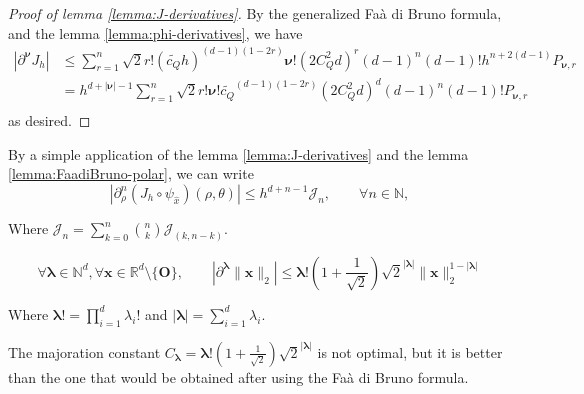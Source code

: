 ﻿\documentclass{article}
\begin{document}
\begin{proof}[Proof of lemma \ref{lemma:J-derivatives}] By the generalized Faà di Bruno formula, and the lemma \ref{lemma:phi-derivatives}, we have
\begin{align}
  \left|\partial^{\bm\nu}J_h\right| & \leq \sum_{r=1}^{n}\sqrt 2r!(\widetilde{c_Q}h)^{(d-1)(1-2r)}\bm\nu!(2C_Q^2d)^{r}(d-1)^n(d-1)!h^{n+2(d-1)}P_{\bm\nu, r} \\
  & = h^{d+|\bm\nu| - 1}\sum_{r=1}^{n}\sqrt 2r!\bm\nu!\widetilde{c_Q}^{(d-1)(1-2r)}(2C_Q^2d)^d(d-1)^n(d-1)!P_{\bm\nu, r} \\
\end{align}
as desired.
\end{proof}

\begin{corollary} By a simple application of the lemma \ref{lemma:J-derivatives} and the lemma \ref{lemma:FaadiBruno-polar}, we can write
  \begin{equation}
    |\partial^n_\rho(J_h\circ\psi_{\hat x})(\rho, \theta)| \leq h^{d+n-1}\mathcal J_n, \qquad \forall n\in\mathbb N, 
  \end{equation}

  Where $\displaystyle{\mathcal J_n = \sum_{k=0}^{n}\binom{n}{k}\mathcal J_{(k, n-k)}}$.
\end{corollary}

\begin{lemma}\label{lemma:majoration-norm-cauchy}

\begin{equation}
  \forall \bm\lambda\in\mathbb N^d, \forall \bm x\in\mathbb R^d\setminus\{\bm O\}, \qquad \left|\partial^{\bm\lambda}\|\bm x\|_2\right| \leq \bm\lambda !\left(1+\frac{1}{\sqrt 2}\right)\sqrt 2^{|\bm\lambda|}\|\bm x\|_2^{1-|\bm\lambda|}
\end{equation}

Where $\bm\lambda ! = \prod_{i=1}^{d}\lambda_i!$ and $|\bm\lambda| = \sum_{i=1}^{d}\lambda_i$.
  
\end{lemma}

\begin{remark} The majoration constant $C_{\bm\lambda} = \bm\lambda !\left(1+\frac{1}{\sqrt 2}\right)\sqrt 2^{|\bm\lambda|}$ is not optimal, but it is better than the one that would be obtained after using the Faà di Bruno formula.
\end{remark}
\end{document}
